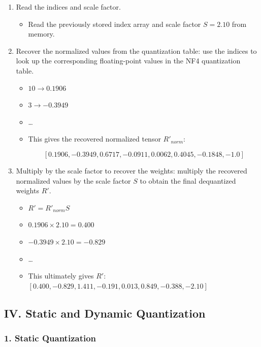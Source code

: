 \begin{enumerate}
\def\labelenumi{\arabic{enumi}.}
\item
  Read the indices and scale factor.

  \begin{itemize}
  \tightlist
  \item
    Read the previously stored index array and scale factor \(S = 2.10\) from memory.
  \end{itemize}
\item
  Recover the normalized values from the quantization table: use the indices to look up the corresponding floating-point values in the NF4 quantization table.

  \begin{itemize}
  \tightlist
  \item
    \(10 \to 0.1906\)
  \item
    \(3 \to -0.3949\)
  \item
    \ldots{}
  \item
    This gives the recovered normalized tensor \(R'_{norm}\):

\[
[0.1906, -0.3949, 0.6717, -0.0911, 0.0062, 0.4045, -0.1848, -1.0]
\]
  \end{itemize}
\item
  Multiply by the scale factor to recover the weights: multiply the recovered normalized values by the scale factor \(S\) to obtain the final dequantized weights \(R'\).

  \begin{itemize}
  \tightlist
  \item
    \(R' = R'_{norm}S\)
  \item
    \(0.1906 \times 2.10 = 0.400\)
  \item
    \(-0.3949 \times 2.10 = -0.829\)
  \item
    \ldots{}
  \item
    This ultimately gives \(R'\): \([0.400, -0.829, 1.411, -0.191, 0.013, 0.849, -0.388, -2.10]\)
  \end{itemize}
\end{enumerate}

\hypertarget{iv.-static-and-dynamic-quantization}{%
\subsection{IV. Static and Dynamic Quantization}\label{iv.-static-and-dynamic-quantization}}

\hypertarget{static-quantization}{%
\subsubsection{1. Static Quantization}\label{static-quantization}}

